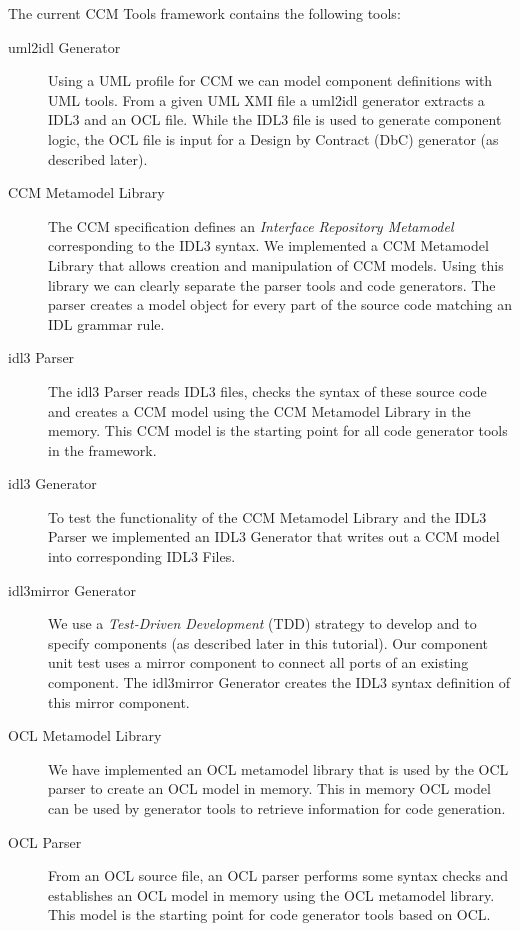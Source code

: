 The current CCM Tools framework contains the following tools:
\begin{description}
\item [uml2idl Generator]
Using a UML profile for CCM \cite{} we can model component definitions with
UML tools. From a given UML XMI file a uml2idl generator extracts a IDL3 
and an OCL file. 
While the IDL3 file is used to generate component logic, the OCL file is input
for a Design by Contract (DbC) generator (as described later).

\item [CCM Metamodel Library]
The CCM specification defines an {\it Interface Repository Metamodel} 
corresponding to the IDL3 syntax. We implemented a CCM Metamodel Library that 
allows creation and manipulation of CCM models. Using this library we can 
clearly separate the parser tools and code generators. 
The parser creates a model object for every part of the
source code matching an IDL grammar rule.

\item [idl3 Parser]
The idl3 Parser reads IDL3 files, checks the syntax of these source code
and creates a CCM model using the CCM Metamodel Library in the memory. This CCM
model is the starting point for all code generator tools in the framework.

\item [idl3 Generator]
To test the functionality of the CCM Metamodel Library and the IDL3 Parser we 
implemented an IDL3 Generator that writes out a CCM model into corresponding 
IDL3 Files.

\item [idl3mirror Generator]
We use a {\it Test-Driven Development} (TDD) strategy to develop and to specify
components (as described later in this tutorial). Our component unit test uses a
mirror component to connect all ports of an existing component. The idl3mirror
Generator creates the IDL3 syntax definition of this mirror component.


\item [OCL Metamodel Library]
We have implemented an OCL metamodel library that is used by the OCL parser
to create an OCL model in memory.
This in memory OCL model can be used by generator tools to retrieve
information for code generation.

\item [OCL Parser]
From an OCL source file, an OCL parser performs some syntax checks and
establishes an OCL model in memory using the OCL metamodel library. 
This model is the starting point for code generator tools based on OCL. 


\end{description}
